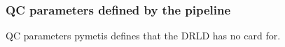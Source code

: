 

















\subsubsection{QC parameters defined by the pipeline}
QC parameters pymetis defines that the DRLD has no card for.










